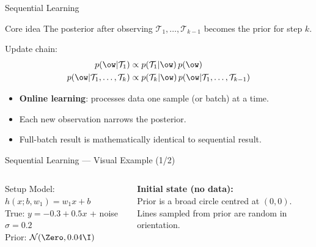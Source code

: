\begin{frame}{Sequential Learning}
  \begin{block}{Core idea}
    The posterior after observing $\mathcal{T}_{1},\ldots,\mathcal{T}_{k-1}$ becomes the \alert{prior} for step $k$.
  \end{block}
  \vspace{.3em}
  Update chain:
  \begin{align*}
    p(\ow|\mathcal{T}_1) &\propto p(\mathcal{T}_1|\ow)\,p(\ow)\\
    p(\ow|\mathcal{T}_1,\ldots,\mathcal{T}_k) &\propto p(\mathcal{T}_k|\ow)\,p(\ow|\mathcal{T}_1,\ldots,\mathcal{T}_{k-1})
  \end{align*}
  \begin{itemize}
    \item \textbf{Online learning}: processes data one sample (or batch) at a time.
    \item Each new observation narrows the posterior.
    \item Full-batch result is mathematically identical to sequential result.
  \end{itemize}
\end{frame}

\begin{frame}{Sequential Learning — Visual Example (1/2)}
  \begin{columns}[T]
  \begin{block}{Setup}
    Model: $h(x;b,w_1)=w_1 x+b$\\
    True: $y=-0.3+0.5x$ + noise $\sigma=0.2$\\
    Prior: $\mathcal{N}(\Zero, 0.04\I)$
  \end{block}
  \vspace{.3em}
  \textbf{Initial state (no data):}\\
  Prior is a broad circle centred at $(0,0)$.\\
  Lines sampled from prior are random in orientation.
  \begin{center}
  \end{center}
  \end{columns}
\end{frame}

